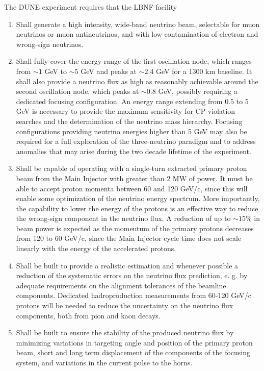 The DUNE experiment requires that the LBNF facility
\begin{enumerate} 
\item Shall generate a high intensity, wide-band neutrino beam,
  selectable for muon neutrinos or muon antineutrinos, and with low
  contamination of electron and wrong-sign neutrinos.
\item Shall fully cover the energy range of the first oscillation
  node, which ranges from $\sim 1$ GeV to $\sim 5$ GeV and peaks at
  $\sim 2.4$ GeV for a 1300 km baseline. It shall also provide a
  neutrino flux as high as reasonably achievable around the second
  oscillation node, which peaks at $\sim 0.8$ GeV, possibly requiring
  a dedicated focusing configuration. An energy range extending
  from 0.5 to 5 GeV is necessary to provide the maximum sensitivity
  for CP violation searches and the determination of the neutrino mass
  hierarchy. Focusing configurations providing neutrino energies
  higher than 5 GeV may also be required for a full exploration of the
  three-neutrino paradigm and to address anomalies that may arise
  during the two decade lifetime of the experiment. 
\item Shall be capable of operating with a single-turn extracted primary proton beam
  from the Main Injector with greater than 2 MW of power. It must be
  able to accept proton momenta between 60 and 120 GeV/c, since this
  will enable some optimization of the neutrino energy spectrum. More
  importantly, the capability to lower the energy of the protons is an
  effective way to reduce the wrong-sign component in the neutrino
  flux. A reduction of up to $\sim 15 \%$ in beam power is expected as
  the momentum of the primary protons decreases from 120 to 60 GeV/c, since the Main Injector cycle time does not scale linearly with the energy of the accelerated protons.
\item Shall be built to provide a realistic estimation and whenever
  possible a reduction of the systematic errors on the neutrino flux prediction, e. g. by adequate requirements on the alignment tolerances of the beamline components. Dedicated hadroproduction measurements from 60-120 GeV/c protons will be needed to reduce the uncertainty on the neutrino flux components, both from pion and kaon decays. 
\item Shall be built to ensure the stability of the produced neutrino flux by minimizing variations in targeting angle and position of the primary proton beam, short and long term displacement of the components of the focusing system, and variations in the current pulse to the horns.
\end{enumerate}

